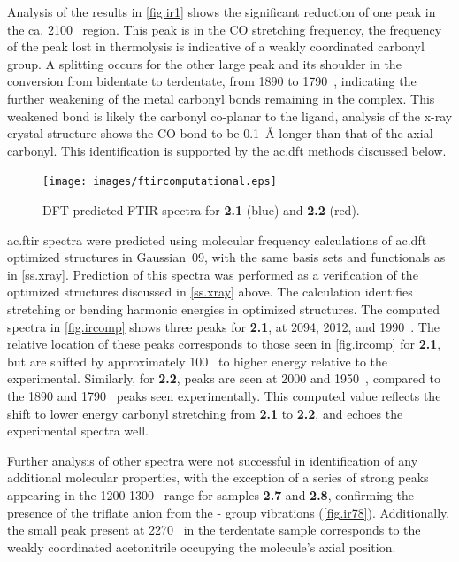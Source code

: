 Analysis of the results in \autoref{fig.ir1} shows the significant reduction of one peak in the ca. 2100~ region. This peak is in the CO stretching frequency, the frequency of the peak lost in thermolysis is indicative of a weakly coordinated carbonyl group. A splitting occurs for the other large peak and its shoulder in the conversion from bidentate to terdentate, from 1890 to 1790~, indicating the further weakening of the metal carbonyl bonds remaining in the complex. This weakened bond is likely the carbonyl co-planar to the ligand, analysis of the x-ray crystal structure shows the CO bond to be 0.1~\r{A} longer than that of the axial carbonyl. This identification is supported by the \gls{ac.dft} methods discussed below.

\begin{figure}[!htb]
 \centering
 \texttt{[image: images/ftircomputational.eps]}
 \caption[DFT predicted FTIR spectra for \textbf{2.1} and \textbf{2.2}]{DFT predicted FTIR spectra for \textbf{2.1} (blue) and \textbf{2.2} (red).}
 \label{fig.ircomp}
\end{figure}

\Gls{ac.ftir} spectra were predicted using molecular frequency calculations of \gls{ac.dft} optimized structures in Gaussian~09, with the same basis sets and functionals as in \autoref{ss.xray}. Prediction of this spectra was performed as a verification of the optimized structures discussed in \autoref{ss.xray} above. The calculation identifies stretching or bending harmonic energies in optimized structures. The computed spectra in \autoref{fig.ircomp} shows three peaks for \textbf{2.1}, at 2094, 2012, and 1990~. The relative location of these peaks corresponds to those seen in \autoref{fig.ircomp} for \textbf{2.1}, but are shifted by approximately 100~ to higher energy relative to the experimental. Similarly, for \textbf{2.2}, peaks are seen at 2000 and 1950~, compared to the 1890 and 1790~ peaks seen experimentally. This computed value reflects the shift to lower energy carbonyl stretching from \textbf{2.1} to \textbf{2.2}, and echoes the experimental spectra well.

Further analysis of other spectra were not successful in identification of any additional molecular properties, with the exception of a series of strong peaks appearing in the 1200-1300~ range for samples \textbf{2.7} and \textbf{2.8}, confirming the presence of the triflate anion from the - group vibrations (\autoref{fig.ir78}). Additionally, the small peak present at 2270~ in the terdentate sample corresponds to the weakly coordinated acetonitrile occupying the molecule's axial position.

